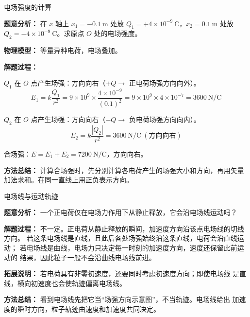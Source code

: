 \begin{examplebox}{电场强度的计算}

\textbf{题意分析：} 在 $x$ 轴上 $x_1 = -0.1\ \mathrm{m}$ 处放 $Q_1 = +4 \times 10^{-9}\ \mathrm{C}$，$x_2 = 0.1\ \mathrm{m}$ 处放 $Q_2 = -4 \times 10^{-9}\ \mathrm{C}$。求原点 $O$ 处的电场强度。

\textbf{物理模型：} 等量异种电荷，电场叠加。

\begin{center}


\label{fig:example-dipole-origin-field}
\end{center}

\textbf{解题过程：}

$Q_1$ 在 $O$ 点产生场强：方向向右（$+Q \to$ 正电荷场强方向向外）。
\[
E_1 = k\frac{Q_1}{r^2} = 9 \times 10^9 \times \frac{4 \times 10^{-9}}{(0.1)^2} = 9 \times 10^9 \times 4 \times 10^{-7} = 3600\ \mathrm{N/C}
\]

$Q_2$ 在 $O$ 点产生场强：方向向右（$-Q \to$ 负电荷场强方向向内）。
\[
E_2 = k\frac{|Q_2|}{r^2} = 3600\ \mathrm{N/C}\ (\text{方向向右})
\]

合场强：$E = E_1 + E_2 = 7200\ \mathrm{N/C}$，方向向右。

\textbf{方法总结：} 计算合场强时，先分别计算各电荷产生的场强大小和方向，再用矢量加法求和。在同一直线上用正负表示方向。

\end{examplebox}

\begin{examplebox}{电场线与运动轨迹}

\textbf{题意分析：} 一个正电荷仅在电场力作用下从静止释放，它会沿电场线运动吗？

\textbf{解题过程：}
不一定。正电荷从静止释放的瞬间，加速度方向沿该点电场线的切线方向。
若这条电场线是直线，且此后各处场强始终沿这条直线，电荷会沿直线运动；
若电场线是曲线，电场力只决定每一时刻的加速度方向，速度还保留此前运动的
结果，因此粒子一般不会沿曲线电场线前进。

\textbf{拓展说明：} 若电荷具有非零初速度，还要同时考虑初速度方向；即使电场线
是直线，横向初速度也会使轨迹偏离电场线。

\textbf{方法总结：} 看到电场线先把它当“场强方向示意图”，不当轨迹。电场线给出
加速度的瞬时方向，粒子轨迹由速度和加速度共同决定。

\end{examplebox}

